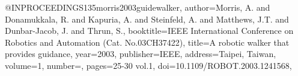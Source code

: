 @INPROCEEDINGS{135morris2003guidewalker,
author={Morris, A. and Donamukkala, R. and Kapuria, A. and Steinfeld, A. and Matthews, J.T. and Dunbar-Jacob, J. and Thrun, S.},
booktitle={IEEE International Conference on Robotics and Automation (Cat. No.03CH37422)}, 
title={A robotic walker that provides guidance}, 
year={2003},
publisher={IEEE},
address={Taipei, Taiwan},
volume={1},
number={},
pages={25-30 vol.1},
doi={10.1109/ROBOT.2003.1241568},}